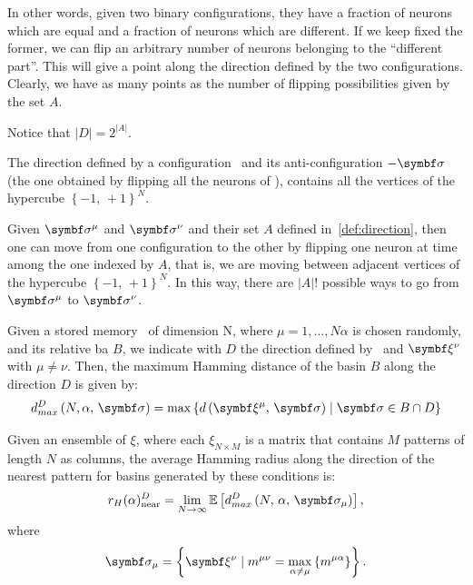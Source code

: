 \documentclass[\rootdir/main.tex]{subfiles}
\begin{document}
In other words, given two binary configurations, they have a fraction of neurons which are equal and a fraction of neurons which are different. If we keep fixed the former, we can flip an arbitrary number of neurons belonging to the ``different part''. This will give a point along the direction defined by the two configurations. Clearly, we have as many points as the number of flipping possibilities given by the set ${A}$.
\begin{remark}
    Notice that $|{D}| = 2^{|{A}|}$.
\end{remark}
\begin{remark}
    The direction defined by a configuration \bsigma\ and its anti-configuration $- \bsigma$ (\ie the one obtained by flipping all the neurons of \bsigma), contains all the vertices of the hypercube $\left\{-1, \, +1 \right\}^N$.
\end{remark}
\begin{remark}
    Given $\bsigma^\mu$ and $\bsigma^\nu$ and their set $A$ defined in~\cref{def:direction}, then one can move from one configuration to the other by flipping one neuron at time among the one indexed by $A$, that is, we are moving between adjacent vertices of the hypercube $\left\{-1, \, +1\right\}^N$. In this way, there are $|A|!$ possible ways to go from $\bsigma^\mu$ to $\bsigma^\nu$.
\end{remark}
\begin{definition}
    Given a stored memory \bxi\ of dimension N, where $\mu = 1, \dots, N\alpha$ is chosen randomly, and its relative \acrlong{ba} ${B}$, we indicate with ${D}$ the direction defined by \bxi\ and $\bxi[\nu]$ with $\mu \neq \nu$. Then, the maximum Hamming distance of the basin ${B}$ along the direction ${D}$ is given by:
    \begin{equation}
        d_{max}^{{D}} \left( N, \alpha, \, \bsigma \right) = \max \left\{ d\left( \bxi, \, \bsigma \right) \mid \bsigma \in {B} \cap {D} \right\}
    \end{equation}
\end{definition}
\begin{definition}
    Given an ensemble of $\xi$, where each $\xi_{N \times M}$ is
    a matrix that contains $M$ patterns of length $N$ as columns, the average Hamming radius along the direction of the nearest pattern for basins generated by these conditions is:
    \begin{equation}
        r_{H}(\alpha)_{\text{near}}^{{D}} = \lim_{N \to \infty} \mathbb{E} \left[ d_{max}^{{D}} \left( N, \, \alpha, \, \bsigma_\mu \right) \right], 
    \end{equation}
    where
    \begin{equation*}
        \bsigma_{\mu} = \left\{ \bxi[\nu] \mid m^{\mu \nu} = \max_{\alpha \neq \mu}\left\{ m^{\mu \alpha} \right\} \right\}.
    \end{equation*}
\end{definition}
\end{document}
